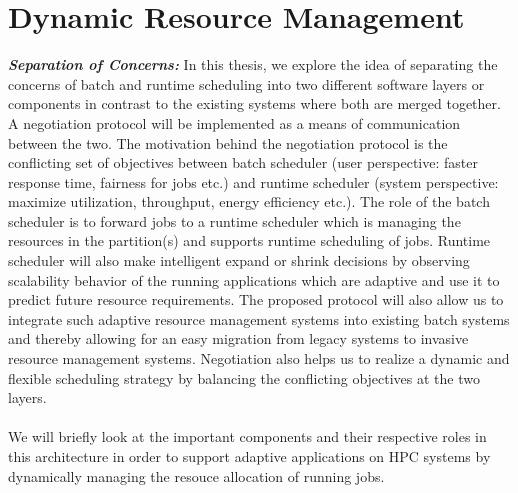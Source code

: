 \section{Dynamic Resource Management}
\textbf{\textit{Separation of Concerns: }}In this thesis, we explore the idea of separating the concerns of batch and runtime scheduling into
two different software layers or components in contrast to the existing systems where both are merged together. A negotiation protocol will be implemented as a means of communication between the two. The motivation behind the negotiation protocol is the conflicting set of objectives between batch scheduler (user perspective: faster response time, fairness for jobs etc.) and runtime scheduler (system perspective: maximize utilization, throughput, energy efficiency etc.). The role of the batch scheduler is to forward jobs to a runtime scheduler which is managing the resources in the partition(s) and supports runtime scheduling of jobs. Runtime scheduler will also make intelligent expand or shrink decisions by observing scalability behavior of the running applications which are adaptive and use it to predict future resource requirements. The proposed protocol will also allow us to integrate such adaptive resource management systems into existing batch systems and thereby allowing for an easy migration from legacy systems to invasive resource management systems. Negotiation also helps us to realize a dynamic and flexible scheduling strategy by balancing the conflicting objectives at the two layers.\\ \\
We will briefly look at the important components and their respective roles in this architecture in order to support adaptive applications on HPC systems by dynamically managing the resouce allocation of running jobs. 
